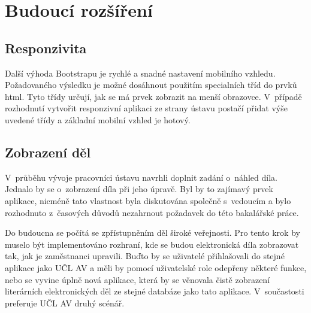 
\chapter{Budoucí rozšíření}
        
    \section{Responzivita}
        Další výhoda Bootstrapu je rychlé a snadné nastavení mobilního vzhledu. Požadovaného výsledku je možné dosáhnout použitím specialních tříd do prvků html. Tyto třídy určují, jak se má prvek zobrazit na menší obrazovce. V~případě rozhodnutí vytvořit responzivní aplikaci ze strany ústavu postačí přidat výše uvedené třídy a základní mobilní vzhled je hotový.
        
        
    \section{Zobrazení děl}
        V~průběhu vývoje pracovníci ústavu navrhli doplnit zadání o~náhled díla. Jednalo by se o~zobrazení díla při jeho úpravě. Byl by to zajímavý prvek aplikace, nicméně tato vlastnost byla diskutována společně s~vedoucím a bylo rozhodnuto z~časových důvodů nezahrnout požadavek do této bakalářské práce.
        
        Do budoucna se počítá se zpřístupněním děl široké veřejnosti. Pro tento krok by muselo být implementováno rozhraní, kde se budou elektronická díla zobrazovat tak, jak je zaměstnanci upravili. Buďto by se uživatelé přihlašovali do stejné aplikace jako UČL AV a měli by pomocí uživatelské role odepřeny některé funkce, nebo se vyvine úplně nová aplikace, která by se věnovala čistě zobrazení literárních elektronických děl ze stejné databáze jako tato aplikace. V~součastosti preferuje UČL AV druhý scénář.
        
        
